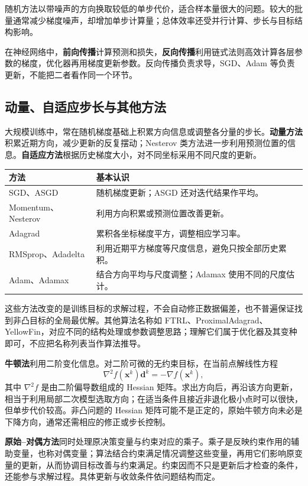 \documentclass[UTF8,fontset=fandol,a4paper,12pt]{ctexart}
\newcommand{\vx}{\boldsymbol x}
\theoremstyle{definition}
\begin{document}
随机方法以带噪声的方向换取较低的单步代价，适合样本量很大的问题。较大的批量通常减少梯度噪声，却增加单步计算量；总体效率还受并行计算、步长与目标结构影响。

在神经网络中，\textbf{前向传播}计算预测和损失，\textbf{反向传播}利用链式法则高效计算各层参数的梯度，优化器再用梯度更新参数。反向传播负责求导，SGD、Adam 等负责更新，不能把二者看作同一个环节。

\subsection{动量、自适应步长与其他方法}
大规模训练中，常在随机梯度基础上积累方向信息或调整各分量的步长。\textbf{动量方法}积累近期方向，减少更新的反复摆动；Nesterov 类方法进一步利用预测位置的信息。\textbf{自适应方法}根据历史梯度大小，对不同坐标采用不同尺度的更新。
\begin{center}
\begin{tabular}{p{}p{}}
\toprule
方法 & 基本认识\\
\midrule
SGD、ASGD & 随机梯度更新；ASGD 还对迭代结果作平均。\\
Momentum、Nesterov & 利用方向积累或预测位置改善更新。\\
Adagrad & 累积各坐标梯度平方，调整相应学习率。\\
RMSprop、Adadelta & 利用近期平方梯度等尺度信息，避免只按全部历史累积。\\
Adam、Adamax & 结合方向平均与尺度调整；Adamax 使用不同的尺度估计。\\
\bottomrule
\end{tabular}
\end{center}
这些方法改变的是训练目标的求解过程，不会自动修正数据偏差，也不普遍保证找到非凸目标的全局最优解。其他算法名称如 FTRL、ProximalAdagrad、YellowFin，对应不同的结构处理或参数调整思路；理解它们属于优化器及其变种即可，不应把名称列表当作算法推导。

\textbf{牛顿法}利用二阶变化信息。对二阶可微的无约束目标，在当前点解线性方程
\[
 \nabla^2 f(\vx^k)\boldsymbol d^k=-\nabla f(\vx^k),
\]
其中 $\nabla^2 f$ 是由二阶偏导数组成的 Hessian 矩阵。求出方向后，再沿该方向更新，相当于利用局部二次模型选取方向；在适当条件且接近非退化极小点时可以很快，但单步代价较高。非凸问题的 Hessian 矩阵可能不是正定的，原始牛顿方向未必是下降方向，通常还需相应的修正或步长控制。

\textbf{原始--对偶方法}同时处理原决策变量与约束对应的乘子。乘子是反映约束作用的辅助变量，也称对偶变量；算法结合约束满足情况调整这些变量，再用它们影响原变量的更新，从而协调目标改善与约束满足。约束因而不只是更新后才检查的条件，还能参与求解过程。具体更新与收敛条件依问题结构而定。
\end{document}
